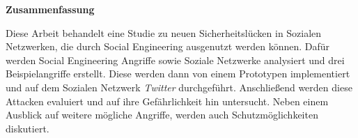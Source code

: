 
\clearemptydoublepage
{}
{}


\vspace*{2cm}
\begin{center}
{\Large \bf Zusammenfassung}
\end{center}
\vspace{1cm}

Diese Arbeit behandelt eine Studie zu neuen Sicherheitslücken in Sozialen
Netzwerken, die durch Social Engineering ausgenutzt werden können. Dafür werden
Social Engineering Angriffe sowie Soziale Netzwerke analysiert und drei
Beispielangriffe erstellt. Diese werden dann von einem Prototypen implementiert
und auf dem Sozialen Netzwerk \textit{Twitter} durchgeführt. Anschließend
werden diese Attacken evaluiert und auf ihre Gefährlichkeit hin untersucht.
Neben einem Ausblick auf weitere mögliche Angriffe, werden auch
Schutzmöglichkeiten diskutiert.

